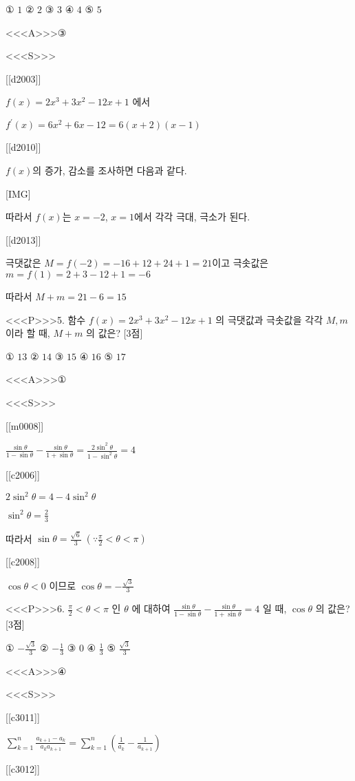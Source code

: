\documentclass{oblivoir}
\begin{document}
① $1$
② $2$
③ $3$
④ $4$
⑤ $5$


<<<A>>>③

<<<S>>>

[[d2003]]

$f(x)=2 x^{3}+3 x^{2}-12 x+1$ 에서

$f^{\prime}(x)=6 x^{2}+6 x-12=6(x+2)(x-1)$

[[d2010]]

$f(x)$의 증가, 감소를 조사하면 다음과 같다.

[IMG]

따라서 $f(x)$는 $x=-2$, $x=1$에서 각각 극대, 극소가 된다.

[[d2013]]

극댓값은 $M=f(-2)=-16+12+24+1=21$이고
극솟값은 $m=f(1)=2+3-12+1=-6$

따라서 $M+m=21-6=15$


<<<P>>>5. 함수 $f(x)=2 x^{3}+3 x^{2}-12 x+1$ 의 극댓값과 극솟값을 각각 $M, m$ 이라 할 때, $M+m$ 의 값은? [3점]

① $13$
② $14$
③ $15$
④ $16$
⑤ $17$

<<<A>>>①

<<<S>>>

[[m0008]]

$ \frac{\sin \theta}{1-\sin \theta}-\frac{\sin \theta}{1+\sin \theta}=\frac{2 \sin ^{2} \theta}{1-\sin ^{2} \theta}=4$

[[c2006]]

$2 \sin ^{2} \theta=4-4 \sin ^{2} \theta$

$\sin ^{2} \theta=\frac{2}{3}$

따라서 $\sin \theta=\frac{\sqrt{6}}{3}\;\left(\because \frac{\pi}{2}<\theta<\pi\right)$

[[c2008]]

$\cos \theta<0$ 이므로 $\cos \theta=-\frac{\sqrt{3}}{3}$


<<<P>>>6. $\frac{\pi}{2}<\theta<\pi$ 인 $\theta$ 에 대하여 $\frac{\sin \theta}{1-\sin \theta}-\frac{\sin \theta}{1+\sin \theta}=4$ 일 때, $\cos \theta$ 의 값은? [3점]

① $-\frac{\sqrt{3}}{3}$
② $-\frac{1}{3}$
③ $0$
④ $\frac{1}{3}$
⑤ $\frac{\sqrt{3}}{3}$

<<<A>>>④

<<<S>>>

[[c3011]]

$ \sum_{k=1}^{n} \frac{a_{k+1}-a_{k}}{a_{k} a_{k+1}} =\sum_{k=1}^{n}\left(\frac{1}{a_{k}}-\frac{1}{a_{k+1}}\right)$

[[c3012]]
\end{document}
